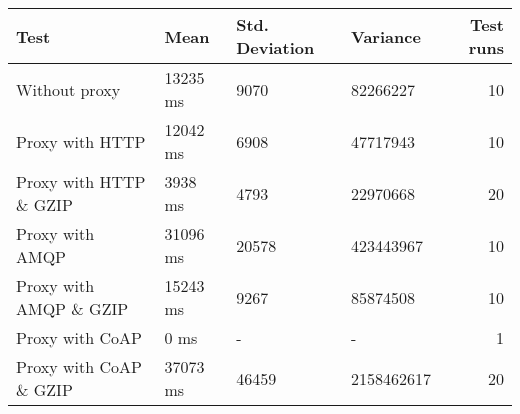 \begin{tabularx}{\textwidth}{llllr}
\hline
 Test                   & Mean     & Std. Deviation   & Variance   &   Test runs \\
\hline
 Without proxy          & 13235 ms & 9070             & 82266227   &          10 \\
 Proxy with HTTP        & 12042 ms & 6908             & 47717943   &          10 \\
 Proxy with HTTP \& GZIP & 3938 ms  & 4793             & 22970668   &          20 \\
 Proxy with AMQP        & 31096 ms & 20578            & 423443967  &          10 \\
 Proxy with AMQP \& GZIP & 15243 ms & 9267             & 85874508   &          10 \\
 Proxy with CoAP        & 0 ms     & -                & -          &           1 \\
 Proxy with CoAP \& GZIP & 37073 ms & 46459            & 2158462617 &          20 \\
\hline
\end{tabularx}